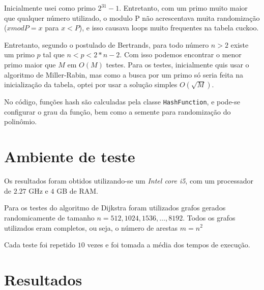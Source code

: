 \documentclass{article}
\begin{document}
Inicialmente usei como primo $2^{31} - 1$. Entretanto, com um primo muito maior que qualquer número
utilizado, o modulo P não acrescentava muita randomização ($ x mod P = x$ para $x < P$), e isso
causava loops muito frequentes na tabela cuckoo.

Entretanto, segundo o postulado de Bertrands, para todo número $n > 2$ existe um primo $p$ tal que
$n < p < 2 * n - 2$. Com isso podemos encontrar o menor primo maior que $M$ em $O(M)$ testes. Para
os testes, inicialmente quis usar o algoritmo de Miller-Rabin, mas como a busca por um primo só
seria feita na inicialização da tabela, optei por usar a solução simples $O(\sqrt{M})$.

No código, funções hash são calculadas pela classe \texttt{HashFunction}, e pode-se configurar o
grau da função, bem como a semente para randomização do polinômio.

\section{Ambiente de teste}

Os resultados foram obtidos utilizando-se um \emph{Intel core i5}, com um processador de $2.27$ GHz
e $4$ GB de RAM.

Para os testes do algoritmo de Dijkstra foram utilizados grafos gerados randomicamente de tamanho
$n=512,1024,1536,\ldots,8192$. Todos os grafos utilizados eram completos, ou seja, o número de
arestas $m=n ^ 2$

Cada teste foi repetido $10$ vezes e foi tomada a média dos tempos de execução.

\section{Resultados}
\end{document}
